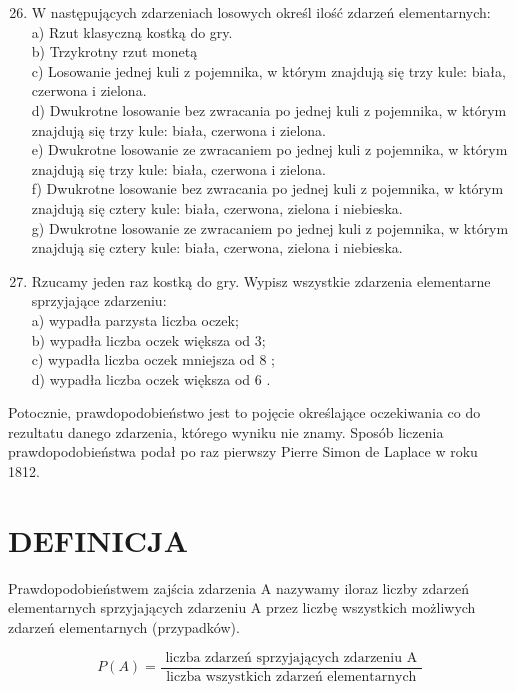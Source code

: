 \documentclass[10pt]{article}
\begin{document}
\begin{enumerate}
  \setcounter{enumi}{25}
  \item W następujących zdarzeniach losowych określ ilość zdarzeń elementarnych:\\
a) Rzut klasyczną kostką do gry.\\
b) Trzykrotny rzut monetą\\
c) Losowanie jednej kuli z pojemnika, w którym znajdują się trzy kule: biała, czerwona i zielona.\\
d) Dwukrotne losowanie bez zwracania po jednej kuli z pojemnika, w którym znajdują się trzy kule: biała, czerwona i zielona.\\
e) Dwukrotne losowanie ze zwracaniem po jednej kuli z pojemnika, w którym znajdują się trzy kule: biała, czerwona i zielona.\\
f) Dwukrotne losowanie bez zwracania po jednej kuli z pojemnika, w którym znajdują się cztery kule: biała, czerwona, zielona i niebieska.\\
g) Dwukrotne losowanie ze zwracaniem po jednej kuli z pojemnika, w którym znajdują się cztery kule: biała, czerwona, zielona i niebieska.
  \item Rzucamy jeden raz kostką do gry. Wypisz wszystkie zdarzenia elementarne sprzyjające zdarzeniu:\\
a) wypadła parzysta liczba oczek;\\
b) wypadła liczba oczek większa od 3;\\
c) wypadła liczba oczek mniejsza od 8 ;\\
d) wypadła liczba oczek większa od 6 .
\end{enumerate}

Potocznie, prawdopodobieństwo jest to pojęcie określające oczekiwania co do rezultatu danego zdarzenia, którego wyniku nie znamy. Sposób liczenia prawdopodobieństwa podał po raz pierwszy Pierre Simon de Laplace w roku 1812.

\section*{DEFINICJA}
Prawdopodobieństwem zajścia zdarzenia A nazywamy iloraz liczby zdarzeń elementarnych sprzyjających zdarzeniu A przez liczbę wszystkich możliwych zdarzeń elementarnych (przypadków).

\[
P(A)=\frac{\text { liczba zdarzeń sprzyjających zdarzeniu A }}{\text { liczba wszystkich zdarzeń elementarnych }}
\]
\end{document}
